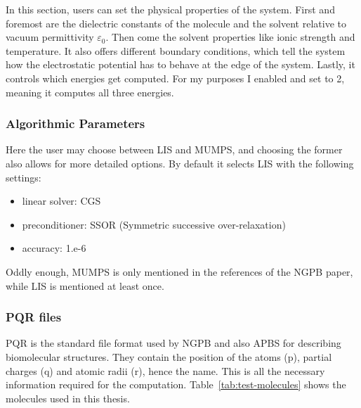 In this section, users can set the physical properties of the system. 
First and foremost are the dielectric constants of the molecule and the solvent relative to vacuum permittivity $\varepsilon_0$.
Then come the solvent properties like ionic strength and temperature.
It also offers different boundary conditions, which tell the system how the electrostatic potential has to behave at the edge of the system.
Lastly, it controls which energies get computed. For my purposes I enabled  and set  to 2, meaning it computes all three energies.

\subsubsection{Algorithmic Parameters}

Here the user may choose between LIS and MUMPS, and choosing the former also allows for more detailed options.
By default it selects LIS with the following settings:
\begin{itemize}
    \item linear solver: CGS
    \item preconditioner: SSOR (Symmetric successive over-relaxation)
    \item accuracy: 1.e-6
\end{itemize}
Oddly enough, MUMPS is only mentioned in the references of the NGPB paper, while LIS is mentioned at least once.

\subsubsection{PQR files}

PQR is the standard file format used by NGPB and also APBS for describing biomolecular structures.
They contain the position of the atoms (p), partial charges (q) and atomic radii (r), hence the name.
This is all the necessary information required for the computation.
Table~\ref{tab:test-molecules} shows the molecules used in this thesis.

